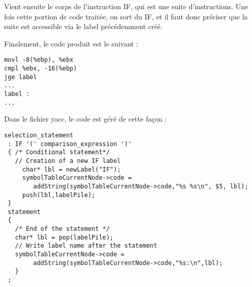 Vient ensuite le corps de l'instruction IF, qui est une suite d'instructions.
Une fois cette portion de code traitée, on sort du IF, et il faut donc préciser que la suite est accessible via le label précédemment créé. 

Finalement, le code produit est le suivant :

\begin{verbatim}
movl -8(%ebp), %ebx
cmpl %ebx, -16(%ebp)
jge label
...
label :
...
\end{verbatim}

Dans le fichier yacc, le code est géré de cette façon :

\begin{verbatim}
selection_statement
 : IF '(' comparison_expression ')' 
 { /* Conditional statement*/
   // Creation of a new IF label
     char* lbl = newLabel("IF");
     symbolTableCurrentNode->code = 
     	addString(symbolTableCurrentNode->code,"%s %s\n", $5, lbl);
     push(lbl,labelPile);
 }
 statement
 {
   /* End of the statement */
   char* lbl = pop(labelPile);
   // Write label name after the statement
   symbolTableCurrentNode->code = 
   		addString(symbolTableCurrentNode->code,"%s:\n",lbl);
   }
 ;
\end{verbatim}